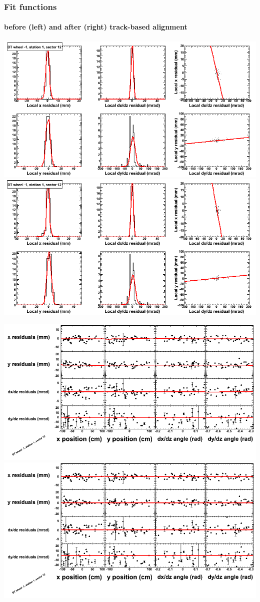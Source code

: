 \documentclass[compress]{beamer}
\begin{document}
\begin{frame}
\frametitle{Fit functions}
\framesubtitle{before (left) and after (right) track-based alignment}
\includegraphics[width=0.5\linewidth]{fitfunctions_re01/MBwhBst1sec12_bellcurves.png} \includegraphics[width=0.5\linewidth]{fitfunctions_re05/MBwhBst1sec12_bellcurves.png}

\includegraphics[width=0.5\linewidth]{fitfunctions_re01/MBwhBst1sec12_polynomials.png} \includegraphics[width=0.5\linewidth]{fitfunctions_re05/MBwhBst1sec12_polynomials.png}
\end{frame}
\end{document}
